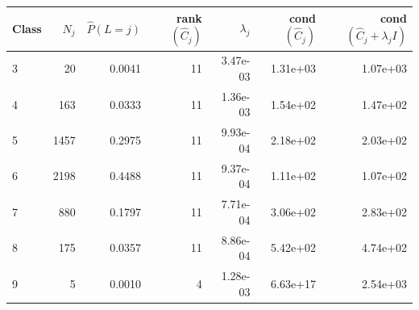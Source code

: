 \begin{tabular}{lrrrrrr}
\toprule
Class & $N_j$ & $\hat P(L{=}j)$ & rank$(\hat C_j)$ & $\lambda_j$ & cond$(\hat C_j)$ & cond$(\hat C_j+\lambda_j I)$ \\
\midrule
3 & 20 & 0.0041 & 11 & 3.47e-03 & 1.31e+03 & 1.07e+03 \\
4 & 163 & 0.0333 & 11 & 1.36e-03 & 1.54e+02 & 1.47e+02 \\
5 & 1457 & 0.2975 & 11 & 9.93e-04 & 2.18e+02 & 2.03e+02 \\
6 & 2198 & 0.4488 & 11 & 9.37e-04 & 1.11e+02 & 1.07e+02 \\
7 & 880 & 0.1797 & 11 & 7.71e-04 & 3.06e+02 & 2.83e+02 \\
8 & 175 & 0.0357 & 11 & 8.86e-04 & 5.42e+02 & 4.74e+02 \\
9 & 5 & 0.0010 & 4 & 1.28e-03 & 6.63e+17 & 2.54e+03 \\
\bottomrule
\end{tabular}
